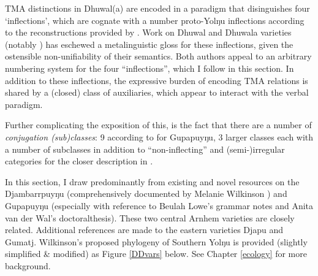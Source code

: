 
TMA distinctions in Dhuwal(a) are encoded in a paradigm that disinguishes four `inflections', which are cognate with a number proto-Yolŋu inflections according to the reconstructions provided by \citet{Bowern2009}. Work on Dhuwal and Dhuwala varieties (notably \citealt{Wilkinson1991,Lowe1996}) has eschewed a metalinguistic gloss for these inflections, given the ostensible non-unifiability of their semantics. Both authors appeal to an arbitrary numbering system for the four ``inflections'', which I follow in this section. In addition to these inflections, the expressive burden of encoding TMA relations is shared by a (closed) class of auxiliaries, which appear to interact with the verbal paradigm. 

Further complicating the exposition of this, is the fact that there are a number of \textit{conjugation (sub)classes}: 9 according to \citet{Lowe1996} for Gupapuyŋu, 3 larger classes each with a number of subclasses in addition to ``non-inflecting'' and (semi-)irregular categories for the closer description in \citet{Wilkinson1991}.

In this section, I draw predominantly from existing and novel resources on the Djambarrpuyŋu (comprehensively documented by Melanie Wilkinson \citeyearpar{Wilkinson1991}) and Gupapuyŋu (especially with reference to Beulah Lowe's grammar notes and Anita van der Wal's \citeyear{VanderWal1992} doctoralthesis). These two central Arnhem varieties are closely related. Additional references are made to the eastern varieties Djapu \citep{Heath1980b,Morphy1983} and Gumatj. Wilkinson's proposed  phylogeny of Southern Yolŋu is provided (slightly simplified \& modified) as Figure \ref{DDvars} below. See Chapter \ref{ecology} for more background.

